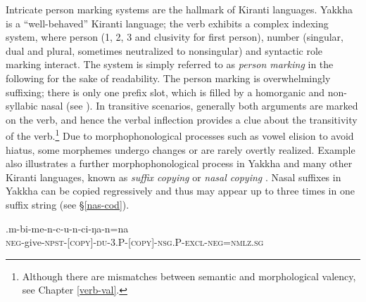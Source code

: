 Intricate person marking systems are the hallmark of Kiranti languages. Yakkha is a “well-behaved” Kiranti language; the verb exhibits a complex indexing system, where person (1, 2, 3 and clusivity for first person), number (singular, dual and plural, sometimes neutralized to nonsingular) and syntactic role marking interact. The system is simply referred to as \emph{person marking} in the following for the sake of readability. The person marking  is overwhelmingly suffixing; there is only one prefix slot, which is filled by a homorganic  and non-syllabic nasal (see \Next). In transitive scenarios, generally both arguments are marked on the verb, and hence the verbal inflection provides a clue about the transitivity of the verb.\footnote{Although there are mismatches between semantic and morphological valency, see Chapter \ref{verb-val}.} Due to morphophonological processes such as vowel elision to avoid hiatus, some morphemes undergo changes or are rarely overtly realized. Example \Next also illustrates a further morphophonological process in Yakkha and many other Kiranti languages, known as \emph{suffix copying} or \emph{nasal copying} \citep{Bickel2003Belhare, Doornenbal2009A-grammar, Ebert2003Kiranti, Schikowski2012_Morphology}. Nasal suffixes in Yakkha  can be copied regressively and thus may appear up to three times in one suffix string (see §\ref{nas-cod}).


\exg.m-bi-me-n-c-u-n-ci-ŋa-n=na\\
{\scshape neg-}give{\scshape -npst-[copy]-du-3.P-[copy]-nsg.P-excl-neg=nmlz.sg}\\


